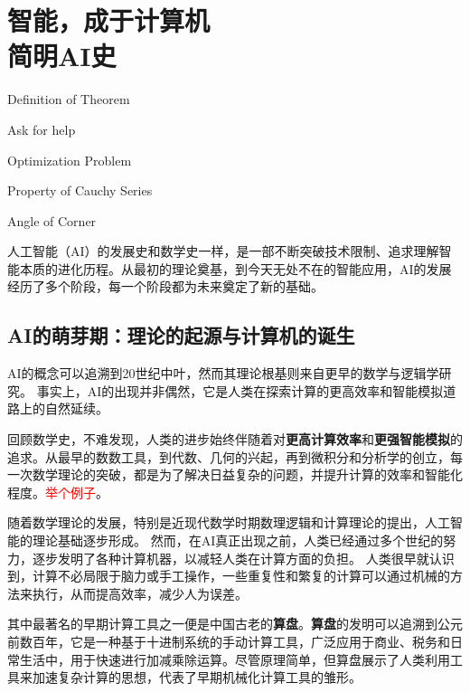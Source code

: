 
\chapter{智能，成于计算机 \texorpdfstring{\\}{ }简明AI史}

 \begin{introduction}
  \item Definition of Theorem
  \item Ask for help
  \item Optimization Problem
  \item Property of Cauchy Series
  \item Angle of Corner
\end{introduction}

                

人工智能（AI）的发展史和数学史一样，是一部不断突破技术限制、追求理解智能本质的进化历程。从最初的理论奠基，到今天无处不在的智能应用，AI的发展经历了多个阶段，每一个阶段都为未来奠定了新的基础。

\section{AI的萌芽期：理论的起源与计算机的诞生}
AI的概念可以追溯到20世纪中叶，然而其理论根基则来自更早的数学与逻辑学研究。
事实上，AI的出现并非偶然，它是人类在探索计算的更高效率和智能模拟道路上的自然延续。

回顾数学史，不难发现，人类的进步始终伴随着对{\bf 更高计算效率}和{\bf 更强智能模拟}的追求。从最早的数数工具，到代数、几何的兴起，再到微积分和分析学的创立，每一次数学理论的突破，都是为了解决日益复杂的问题，并提升计算的效率和智能化程度。\textcolor{red}{举个例子}。

随着数学理论的发展，特别是近现代数学时期数理逻辑和计算理论的提出，人工智能的理论基础逐步形成。
然而，在AI真正出现之前，人类已经通过多个世纪的努力，逐步发明了各种计算机器，以减轻人类在计算方面的负担。
人类很早就认识到，计算不必局限于脑力或手工操作，一些重复性和繁复的计算可以通过机械的方法来执行，从而提高效率，减少人为误差。

其中最著名的早期计算工具之一便是中国古老的{\bf 算盘}。{\bf 算盘}的发明可以追溯到公元前数百年，它是一种基于十进制系统的手动计算工具，广泛应用于商业、税务和日常生活中，用于快速进行加减乘除运算。尽管原理简单，但算盘展示了人类利用工具来加速复杂计算的思想，代表了早期机械化计算工具的雏形。

